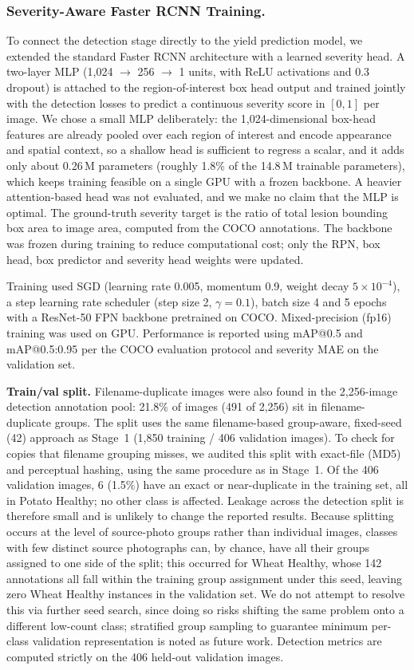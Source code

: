 \subsubsection{Severity-Aware Faster RCNN Training.}
\label{sec:severity_head}
To connect the detection stage directly to the yield prediction model,
we extended the standard Faster RCNN architecture with a learned
severity head. A two-layer MLP (1,024 $\to$ 256 $\to$ 1 units, with
ReLU activations and 0.3 dropout) is attached to the region-of-interest
box head output and trained jointly with the detection losses to predict
a continuous severity score in $[0,1]$ per image. We chose a small
MLP deliberately: the 1,024-dimensional box-head features are already
pooled over each region of interest and encode appearance and spatial
context, so a shallow head is sufficient to regress a scalar, and it
adds only about 0.26\,M parameters (roughly 1.8\% of the 14.8\,M
trainable parameters), which keeps training feasible on a single GPU
with a frozen backbone. A heavier attention-based head was not
evaluated, and we make no claim that the MLP is optimal. The ground-truth
severity target is the ratio of total lesion bounding box area to image
area, computed from the COCO annotations. The backbone was frozen during
training to reduce computational cost; only the RPN, box head, box
predictor and severity head weights were updated.

Training used SGD (learning rate 0.005, momentum 0.9, weight decay
$5\!\times\!10^{-4}$), a step learning rate scheduler (step size 2,
$\gamma = 0.1$), batch size 4 and 5 epochs with a ResNet-50 FPN
backbone pretrained on COCO.
Mixed-precision (fp16) training was used on GPU.
Performance is reported using mAP@0.5 and mAP@0.5:0.95 per the COCO
evaluation protocol and severity MAE on the validation set.

\textbf{Train/val split.}
\label{sec:detection_split}
Filename-duplicate images were also found in the 2,256-image detection
annotation pool: 21.8\% of images (491 of 2,256) sit in filename-duplicate
groups. The split uses the same filename-based group-aware, fixed-seed (42)
approach as Stage~1 (1,850 training / 406 validation images). To check for copies 
that filename grouping misses, we audited this split with exact-file
(MD5) and perceptual hashing, using the same procedure as in Stage~1. Of the
406 validation images, 6 (1.5\%) have an exact or near-duplicate in the
training set, all in Potato Healthy; no other class is affected. Leakage
across the detection split is therefore small and is unlikely to change the
reported results. Because splitting occurs at the level of
source-photo groups rather than individual images, classes with few
distinct source photographs can, by chance, have all their groups
assigned to one side of the split; this occurred for Wheat Healthy,
whose 142 annotations all fall within the training group assignment
under this seed, leaving zero Wheat Healthy instances in the
validation set. We do not attempt to resolve this via further seed
search, since doing so risks shifting the same problem onto a
different low-count class; stratified group sampling to guarantee
minimum per-class validation representation is noted as future work.
Detection metrics are computed strictly on the 406 held-out
validation images.

